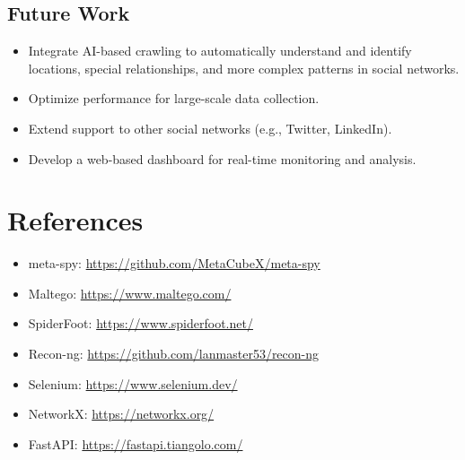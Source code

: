 \documentclass[13pt,a4paper]{report}
\begin{document}
\section{Future Work}
\begin{itemize}
    \item Integrate AI-based crawling to automatically understand and identify locations, special relationships, and more complex patterns in social networks.
    \item Optimize performance for large-scale data collection.
    \item Extend support to other social networks (e.g., Twitter, LinkedIn).
    \item Develop a web-based dashboard for real-time monitoring and analysis.
\end{itemize}

\chapter{References}
\begin{itemize}
    \item meta-spy: \url{https://github.com/MetaCubeX/meta-spy}
    \item Maltego: \url{https://www.maltego.com/}
    \item SpiderFoot: \url{https://www.spiderfoot.net/}
    \item Recon-ng: \url{https://github.com/lanmaster53/recon-ng}
    \item Selenium: \url{https://www.selenium.dev/}
    \item NetworkX: \url{https://networkx.org/}
    \item FastAPI: \url{https://fastapi.tiangolo.com/}
\end{itemize}
\end{document}
